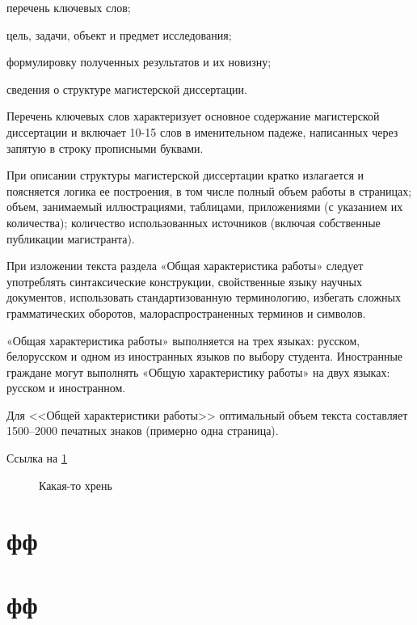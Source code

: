 \documentclass{mpaper}
\begin{document}
    перечень ключевых слов;

    цель, задачи, объект и предмет исследования;

    формулировку полученных результатов и их новизну;

    сведения о структуре магистерской диссертации.

    Перечень ключевых слов характеризует основное содержание магистерской диссертации и включает 10-15 слов в именительном падеже, написанных через запятую в строку прописными буквами.

    При описании структуры магистерской диссертации кратко излагается и поясняется логика ее построения, в том числе полный объем работы в страницах; объем, занимаемый иллюстрациями, таблицами, приложениями (с указанием их количества); количество использованных источников (включая собственные публикации магистранта).

    При изложении текста раздела «Общая характеристика работы»
    следует употреблять синтаксические конструкции, свойственные языку
    научных документов, использовать стандартизованную терминологию,
    избегать сложных грамматических оборотов, малораспространенных
    терминов и символов.

    «Общая характеристика работы» выполняется на трех языках: русском, белорусском и одном из иностранных языков по выбору студента. Иностранные граждане могут выполнять «Общую характеристику работы» на двух языках: русском и иностранном.

    Для <<Общей характеристики работы>> оптимальный объем текста составляет 1500--2000 печатных знаков (примерно одна страница).
    
    Ссылка на \cref{fig:1}
    \begin{figure}
        \centering
        \caption{Какая-то хрень}\label{fig:1}
    \end{figure}

    \section{фф}

    \section{фф}
\end{document}
